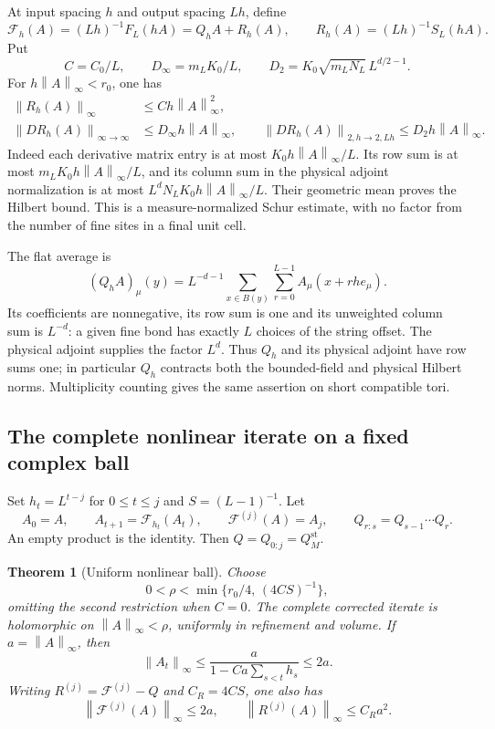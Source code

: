 \documentclass[11pt]{article}
\newtheorem{theorem}{Theorem}[section]
\theoremstyle{remark}
\newcommand{\norm}[1]{\left\|#1\right\|}
\begin{document}
At input spacing $h$ and output spacing $Lh$, define
\begin{equation}
 \mathcal F_h(A)=(Lh)^{-1}F_L(hA)=Q_hA+R_h(A),
 \qquad R_h(A)=(Lh)^{-1}S_L(hA).
 \label{na-physical-map}
\end{equation}
Put
\[
 C=C_0/L,\qquad D_\infty=m_LK_0/L,\qquad
 D_2=K_0\sqrt{m_LN_L}\,L^{d/2-1}.
\]
For $h\norm{A}_\infty<r_0$, one has
\begin{align}
 \norm{R_h(A)}_\infty&\le Ch\norm{A}_\infty^2,
 \label{na-one-step-rem}\\
 \norm{DR_h(A)}_{\infty\to\infty}
    &\le D_\infty h\norm{A}_\infty,
 \qquad
 \norm{DR_h(A)}_{2,h\to2,Lh}
    \le D_2h\norm{A}_\infty.
 \label{na-one-step-der}
\end{align}
Indeed each derivative matrix entry is at most
$K_0h\norm{A}_\infty/L$. Its row sum is at most
$m_LK_0h\norm{A}_\infty/L$, and its column sum in the physical
adjoint normalization is at most
$L^dN_LK_0h\norm{A}_\infty/L$. Their geometric mean proves the
Hilbert bound. This is a measure-normalized Schur estimate, with no
factor from the number of fine sites in a final unit cell.

The flat average is
\[
 (Q_hA)_\mu(y)=L^{-d-1}\sum_{x\in B(y)}\sum_{r=0}^{L-1}
                         A_\mu(x+rh e_\mu).
\]
Its coefficients are nonnegative, its row sum is one and its
unweighted column sum is $L^{-d}$: a given fine bond has exactly
$L$ choices of the string offset. The physical adjoint supplies the
factor $L^d$. Thus $Q_h$ and its physical adjoint have row sums one;
in particular $Q_h$ contracts both the bounded-field and physical
Hilbert norms. Multiplicity counting gives the same assertion on
short compatible tori.

\subsection{The complete nonlinear iterate on a fixed complex ball}
\label{na-uniform-ball}

Set $h_t=L^{t-j}$ for $0\le t\le j$ and $S=(L-1)^{-1}$. Let
\[
 A_0=A,\qquad A_{t+1}=\mathcal F_{h_t}(A_t),\qquad
 \mathcal F^{(j)}(A)=A_j,
 \qquad Q_{r:s}=Q_{s-1}\cdots Q_r.
\]
An empty product is the identity. Then $Q=Q_{0:j}=Q_M^{\mathrm{st}}$.

\begin{theorem}[Uniform nonlinear ball]
\label{na-ball-theorem}
Choose
\begin{equation}
 0<\rho<\min\{r_0/4,\,(4CS)^{-1}\},
 \label{na-radius}
\end{equation}
omitting the second restriction when $C=0$. The complete corrected
iterate is holomorphic on $\norm{A}_\infty<\rho$, uniformly in
refinement and volume. If $a=\norm{A}_\infty$, then
\begin{equation}
 \norm{A_t}_\infty\le
 \frac{a}{1-Ca\sum_{s<t}h_s}\le2a.
 \label{na-riccati}
\end{equation}
Writing $R^{(j)}=\mathcal F^{(j)}-Q$ and $C_R=4CS$, one also has
\begin{equation}
 \norm{\mathcal F^{(j)}(A)}_\infty\le2a,
 \qquad \norm{R^{(j)}(A)}_\infty\le C_Ra^2.
 \label{na-composite-remainder}
\end{equation}
\end{theorem}
\end{document}
